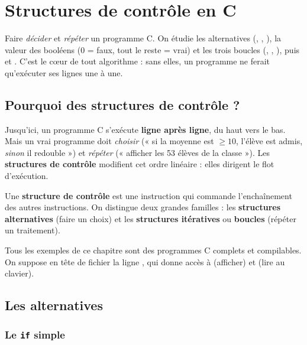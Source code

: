 \chapter{Structures de contrôle en C}

\begin{synthese}[Au programme]
Faire \emph{décider} et \emph{répéter} un programme C. On étudie les alternatives
(, , ), la valeur des booléens (0 = faux,
tout le reste = vrai) et les trois boucles (, ,
), puis  et . C'est le cœur de tout
algorithme : sans elles, un programme ne ferait qu'exécuter ses lignes une à une.
\end{synthese}

\section{Pourquoi des structures de contrôle ?}

Jusqu'ici, un programme C s'exécute \textbf{ligne après ligne}, du haut vers le bas.
Mais un vrai programme doit \emph{choisir} (« si la moyenne est $\geq 10$, l'élève
est admis, \emph{sinon} il redouble ») et \emph{répéter} (« afficher les 53 élèves
de la classe »). Les \textbf{structures de contrôle} modifient cet ordre linéaire :
elles dirigent le flot d'exécution.

\begin{definition}
Une \textbf{structure de contrôle} est une instruction qui commande l'enchaînement
des autres instructions. On distingue deux grandes familles : les \textbf{structures
alternatives} (faire un choix) et les \textbf{structures itératives} ou
\textbf{boucles} (répéter un traitement).
\end{definition}

\begin{remarque}
Tous les exemples de ce chapitre sont des programmes C complets et compilables. On
suppose en tête de fichier la ligne , qui donne accès à
 (afficher) et  (lire au clavier).
\end{remarque}

\section{Les alternatives}

\subsection{Le \texttt{if} simple}

